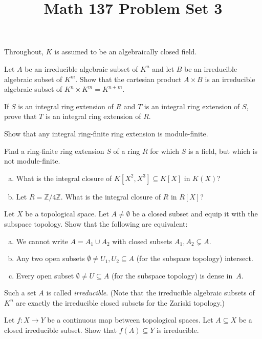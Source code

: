 \documentclass[11pt,letterpaper]{article}
\title{\textbf{Math 137 Problem Set 3}}
\begin{document}
\maketitle

Throughout, $K$ is assumed to be an algebraically closed field.

\begin{problem}
    Let $A$ be an irreducible algebraic subset of $K^n$ and let $B$ be an irreducible algebraic subset of $K^m$. Show that the cartesian product $A\times B$ is an irreducible algebraic subset of $K^n \times K^m = K^{n+m}$.
\end{problem}

\begin{problem}
    If $S$ is an integral ring extension of $R$ and $T$ is an integral ring extension of $S$, prove that $T$ is an integral ring extension of $R$.
\end{problem}

\begin{problem}
    Show that any integral ring-finite ring extension is module-finite.
\end{problem}

\begin{problem}
    Find a ring-finite ring extension $S$ of a ring $R$ for which $S$ is a field, but which is not module-finite.
\end{problem}

\begin{problem}\noindent
    \begin{enumerate}[(a)]
        \item What is the integral closure of $K[X^2,X^3]\subseteq K[X]$ in $K(X)$?
        \item Let $R=\mathbb Z/4\mathbb Z$. What is the integral closure of $R$ in $R[X]$?
    \end{enumerate}
\end{problem}

\begin{problem}
    Let $X$ be a topological space. Let $A\neq\emptyset$ be a closed subset and equip it with the subspace topology. Show that the following are equivalent:
    \begin{enumerate}[(a)]
        \item We cannot write $A=A_1\cup A_2$ with closed subsets $A_1,A_2\subsetneq A$.
        \item Any two open subsets $\emptyset\neq U_1,U_2\subseteq A$ (for the subspace topology) intersect.
        \item Every open subset $\emptyset\neq U\subseteq A$ (for the subspace topology) is dense in~$A$.
    \end{enumerate}
    Such a set $A$ is called \emph{irreducible}. (Note that the irreducible algebraic subsets of $K^n$ are exactly the irreducible closed subsets for the Zariski topology.)
\end{problem}

\begin{problem}
    Let $f:X\rightarrow Y$ be a continuous map between topological spaces. Let $A\subseteq X$ be a closed irreducible subset. Show that $\overline{f(A)}\subseteq Y$ is irreducible.
\end{problem}
\end{document}
